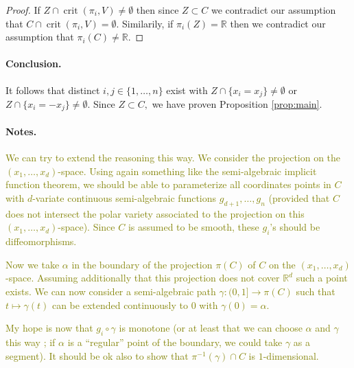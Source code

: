 \documentclass[10pt]{article}
\theoremstyle{definition}
\newcommand{\R}{\mathbb{R}}
\DeclareMathOperator{\crit}{crit}
\def\ms#1{\textcolor{olive}{#1}}
\begin{document}
%
%
\begin{proof}
If $Z \cap \crit(\pi_i,V) \not = \emptyset$ then since $Z \subset C$ we contradict our assumption that $C \cap \crit(\pi_i,V) = \emptyset$. Similarily, if $\pi_i(Z) = \R$ then we contradict our assumption that $\pi_i(C) \not = \R.$  
\end{proof}
%









\paragraph*{Conclusion.}
It follows that distinct $i,j \in\{1,\hdots,n\}$ exist with $Z \cap \{ x_i= x_j\} \not = \emptyset$ or 
$Z \cap \{ x_i= -x_j\} \not = \emptyset.$ Since $Z \subset C,$ we have proven Proposition \ref{prop:main}.
















\paragraph*{Notes.}
\ms{We can try to extend the reasoning this way. We consider the projection on
the $(x_1, \ldots, x_d)$-space. Using again something like the semi-algebraic implicit function theorem, we should be able to parameterize all coordinates points in $C$ with $d$-variate continuous semi-algebraic functions $g_{d+1}, \ldots, g_n$ (provided that $C$ does not intersect the polar variety associated to the projection on this $(x_1, \ldots, x_d)$-space). Since $C$ is
  assumed to be smooth, these $g_i$'s should be diffeomorphisms.}

\ms{Now we take $\alpha$ in the boundary of the projection $\pi(C)$ of $C$ on
  the $(x_1, \ldots, x_d)$-space. Assuming additionally that this projection
  does not cover $\R^d$ such a point exists. We can now consider a
  semi-algebraic path $\gamma:(0, 1]\to \pi(C)$ such that $t\mapsto \gamma(t)$
  can be extended continuously to $0$ with $\gamma(0)=\alpha$. }

\ms{My hope is now that $g_i\circ \gamma$ is monotone (or at least that we can
  choose $\alpha$ and $\gamma$ this way ; if $\alpha$ is a ``regular'' point of
  the boundary, we could take $\gamma$ as a segment). It should be ok also to
  show that $\pi^{-1}(\gamma)\cap C$ is $1$-dimensional. }
\end{document}
